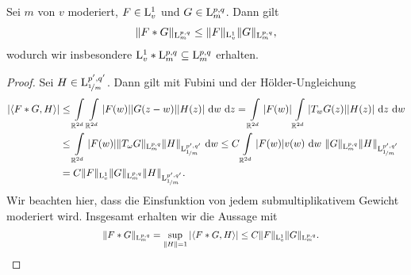 
\begin{sz}\label{th:convolution_mixed_norm}
	Sei $ m $ von $ v $ moderiert, $ F \in \mathrm{L}^1_v $ und $ G \in \mathrm{L}^{p,q}_m $.
	Dann gilt
	\begin{align*}
	\| F \ast G \|_{\mathrm{L}^{p,q}_m}
	\leq 
	\| F \|_{\mathrm{L}^1_v} \|G\|_{\mathrm{L}^{p,q}_m},
	\end{align*}
	wodurch wir insbesondere
	$ \mathrm{L}^1_v \ast \mathrm{L}^{p,q}_m \subseteq \mathrm{L}^{p,q}_m $ erhalten.
\end{sz}

\begin{proof}
	Sei $ H \in \mathrm{L}^{p^\prime,q^\prime}_{\nicefrac{1}{m}} $. Dann gilt mit Fubini und der Hölder-Ungleichung
	\begin{align*}
	| \langle F \ast G , H \rangle |
	&\leq 
	\int \limits_{\R^{2d}}
	\int \limits_{\R^{2d}}
	| F(w)| |G(z-w)| | H(z)| \td{w} \td{z}
	=
	\int \limits_{\R^{2d}}
	|F(w)|
	\int \limits_{\R^{2d}}
	|T_w G(z)| |H(z) |\td{z} \td{w}\\
	&\leq
	\int \limits_{\R^{2d}}
	|F(w)|  
	\|T_\omega G \|_{\L^{p,q}_m} \| H \|_{\L^{p^\prime,q^\prime}_{\nicefrac{1}{m}}}
	\td{w}
	\leq 
	C \int \limits_{\R^{2d}}
	|F(w)| v(w)\td{w} \ 
	\| G \|_{\L^{p,q}_m} \| H \|_{\L^{p^\prime,q^\prime}_{\nicefrac{1}{m}}}\\
	&=
	C \| F \|_{\L^1_v}\| G \|_{\L^{p,q}_m} \| H \|_{\L^{p^\prime,q^\prime}_{\nicefrac{1}{m}}}.
	\end{align*}
	Wir beachten hier, dass die Einsfunktion von jedem submultiplikativem Gewicht moderiert wird. Insgesamt erhalten wir die Aussage mit 
	\begin{align*}
	\qquad \qquad \qquad \qquad \qquad 
	\| F \ast G \|_{\mathrm{L}^{p,q}_m}
	= \sup \limits_{\| H \| = 1}
	|	\langle F\ast G , H \rangle|
	\leq 
	C \| F \|_{\mathrm{L}^1_v} \|G\|_{\mathrm{L}^{p,q}_m}.
	 \qquad
	\qquad \qquad \qquad \ \ \ \qedhere
	\end{align*}
\end{proof}



